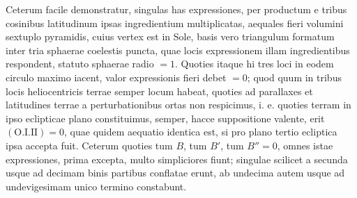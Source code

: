 \par
Ceterum facile demonstratur, singulas has expressiones, per productum e tribus cosinibus latitudinum ipsas ingredientium multiplicatas, aequales fieri volumini sextuplo pyramidis, cuius vertex est in Sole, basis vero triangulum formatum inter tria sphaerae coelestis puncta, quae locis expressionem illam ingredientibus respondent, statuto sphaerae radio $=1$. Quoties itaque hi tres loci in eodem circulo maximo iacent, valor expressionis fieri debet $=0$; quod quum in tribus locis heliocentricis terrae semper locum habeat, quoties ad parallaxes et latitudines terrae a perturbationibus ortas non respicimus, i. e. quoties terram in ipso eclipticae plano constituimus, semper, hacce suppositione valente, erit $(\mathrm{O}.\mathrm{I}.\mathrm{II})=0$, quae quidem aequatio identica est, si pro plano tertio ecliptica ipsa accepta fuit. Ceterum quoties tum $B$, tum $B'$, tum $B''=0$, omnes istae expressiones, prima excepta, multo simpliciores fiunt; singulae scilicet a secunda usque ad decimam binis partibus conflatae erunt, ab undecima autem usque ad undevigesimam unico termino constabunt.
